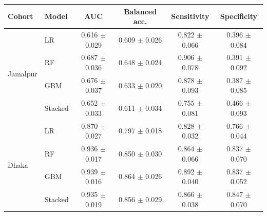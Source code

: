 \begin{tabular}{@{}llcccc@{}}
\toprule
Cohort & Model & AUC & Balanced acc. & Sensitivity & Specificity \\
\midrule
\multirow{4}{*}{Jamalpur} & LR & 0.616 $\pm$ 0.029 & 0.609 $\pm$ 0.026 & 0.822 $\pm$ 0.066 & 0.396 $\pm$ 0.084 \\
 & RF & 0.687 $\pm$ 0.036 & 0.648 $\pm$ 0.024 & 0.906 $\pm$ 0.078 & 0.391 $\pm$ 0.092 \\
 & GBM & 0.676 $\pm$ 0.037 & 0.633 $\pm$ 0.020 & 0.878 $\pm$ 0.093 & 0.387 $\pm$ 0.085 \\
 & Stacked & 0.652 $\pm$ 0.033 & 0.611 $\pm$ 0.034 & 0.755 $\pm$ 0.081 & 0.466 $\pm$ 0.093 \\
\midrule
\multirow{4}{*}{Dhaka} & LR & 0.870 $\pm$ 0.027 & 0.797 $\pm$ 0.018 & 0.828 $\pm$ 0.032 & 0.766 $\pm$ 0.044 \\
 & RF & 0.936 $\pm$ 0.017 & 0.850 $\pm$ 0.030 & 0.864 $\pm$ 0.066 & 0.837 $\pm$ 0.070 \\
 & GBM & 0.939 $\pm$ 0.016 & 0.864 $\pm$ 0.026 & 0.892 $\pm$ 0.040 & 0.837 $\pm$ 0.052 \\
 & Stacked & 0.935 $\pm$ 0.019 & 0.856 $\pm$ 0.029 & 0.866 $\pm$ 0.038 & 0.847 $\pm$ 0.070 \\
\bottomrule
\end{tabular}
